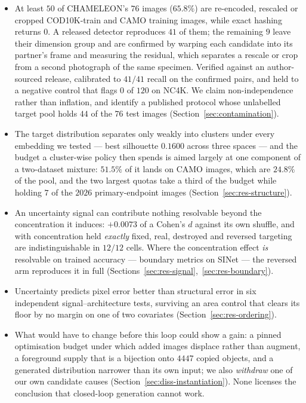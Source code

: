 \documentclass{article} %
\begin{document}
\begin{itemize}
\itemsep0.02em
\item At least $50$ of CHAMELEON's $76$ images ($65.8\%$) are re-encoded, rescaled or cropped
COD10K-train and CAMO training images, while exact hashing returns $0$. A released detector
reproduces $41$ of them; the remaining $9$ leave their dimension group and are confirmed by warping
each candidate into its partner's frame and measuring the residual, which separates a rescale or
crop from a second photograph of the same specimen. Verified against an author-sourced release,
calibrated to $41/41$ recall on the confirmed pairs, and held to a negative control that flags
$0$ of $120$ on NC4K. We claim non-independence rather than inflation, and identify a published protocol whose
unlabelled target pool holds $44$ of the $76$ test images (Section~\ref{sec:contamination}).
\item The target distribution separates only weakly into clusters under every embedding we tested
--- best silhouette $0.1600$ across three spaces --- and the budget a cluster-wise policy then
spends is aimed largely at one component of a two-dataset mixture: $51.5\%$ of it lands on CAMO
images, which are $24.8\%$ of the pool, and the two largest quotas take a third of the budget while
holding $7$ of the $2026$ primary-endpoint images (Section~\ref{sec:res-structure}).
\item An uncertainty signal can contribute nothing resolvable beyond the concentration it induces:
$+0.0073$ of a Cohen's $d$ against its own shuffle, and with concentration held \emph{exactly}
fixed, real, destroyed and reversed targeting are indistinguishable in $12/12$ cells. Where the
concentration effect \emph{is} resolvable on trained accuracy --- boundary metrics on SINet --- the
reversed arm reproduces it in full (Sections~\ref{sec:res-signal},~\ref{sec:res-boundary}).
\item Uncertainty predicts pixel error better than structural error in six independent
signal--architecture tests, surviving an area control that clears its floor by no margin on one of
two covariates (Section~\ref{sec:res-ordering}).
\item What would have to change before this loop could show a gain: a pinned optimisation budget
under which added images displace rather than augment, a foreground supply that is a bijection onto
$4447$ copied objects, and a generated distribution narrower than its own input; we also
\emph{withdraw} one of our own candidate causes (Section~\ref{sec:diss-instantiation}). None
licenses the conclusion that closed-loop generation cannot work.
\end{itemize}
\end{document}
